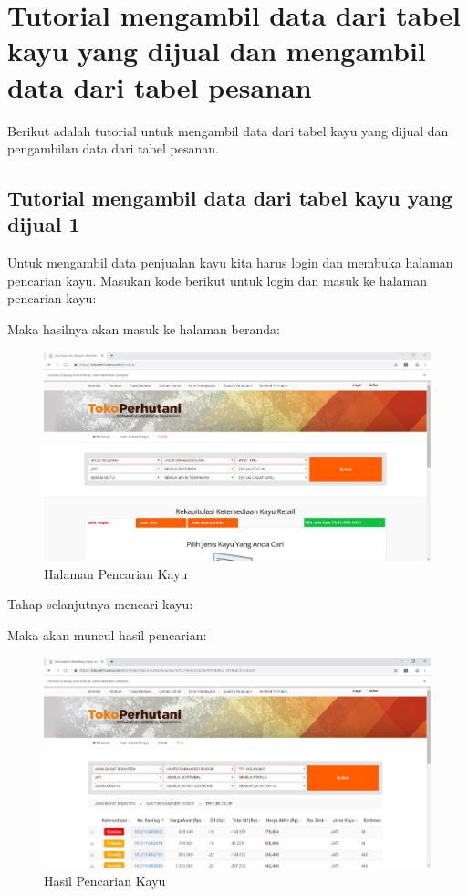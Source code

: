 \newpage
\section{Tutorial mengambil data dari tabel kayu yang dijual dan mengambil data dari tabel pesanan}
Berikut adalah tutorial untuk  mengambil data dari tabel kayu yang dijual dan pengambilan data dari tabel pesanan. 

\subsection{Tutorial mengambil data dari tabel kayu yang dijual 1}
Untuk mengambil data penjualan kayu kita harus login dan membuka halaman pencarian kayu.
Masukan kode berikut untuk login dan masuk ke halaman pencarian kayu:

\newpage
Maka hasilnya akan masuk ke halaman beranda:
\begin{figure}[h]
	\centering
	\includegraphics[scale=0.30]{figures/7beranda}
	\caption{Halaman Pencarian Kayu}
\end{figure}

Tahap selanjutnya mencari kayu:
 

\newpage
Maka akan muncul hasil pencarian:
\begin{figure}[h]
	\centering
	\includegraphics[scale=0.27]{figures/7carikayu}
	\caption{Hasil Pencarian Kayu}
\end{figure}

